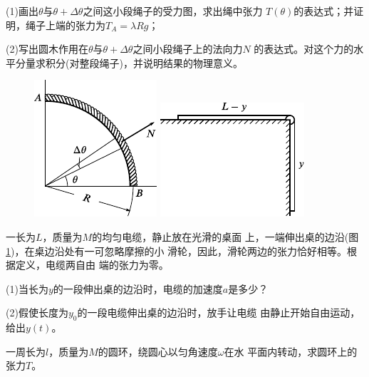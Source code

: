 \begin{exercises}
(1)画出$ \theta $与$ \theta + \Delta \theta$之间这小段绳子的受力图，求出绳中张力
$ T (\theta) $的表达式；并证明，绳子上端的张力为$  T _ { A } = \lambda R g  $；

(2)写出圆木作用在$ \theta $与$  \theta + \Delta \theta  $之间小段绳子上的法向力$ N $
的表达式。对这个力的水平分量求积分(对整段绳子)，并说明结果的物理意义。
\begin{figure}[h]
  \begin{minipage}[b]{0.5\linewidth}
    \centering
    \includegraphics{figure/fig03.37}
    \caption{}
    \label{fig:03.37}
  \end{minipage}
  \begin{minipage}[b]{0.5\linewidth}
    \centering
    \includegraphics{figure/fig03.38}
    \caption{}
    \label{fig:03.38}
  \end{minipage}
  \vspace{-1.56em}
\end{figure}

\exercise 一长为$ L $，质量为$ M $的均匀电缆，静止放在光滑的桌面
上，一端伸出桌的边沿(图\ref{fig:03.38})，在桌边沿处有一可忽略摩擦的小
滑轮，因此，滑轮两边的张力恰好相等。根据定义，电缆两自由
端的张力为零。

(1)当长为$ y $的一段伸出桌的边沿时，电缆的加速度$ a $是多少？

(2)假使长度为$  y _ { 0 }  $的一段电缆伸出桌的边沿时，放手让电缆
由静止开始自由运动，给出$ y(t) $。

\exercise 一周长为$ l $，质量为$ M $的圆环，绕圆心以匀角速度$ \omega $在水
平面内转动，求圆环上的张力$ T $。


\end{exercises}
